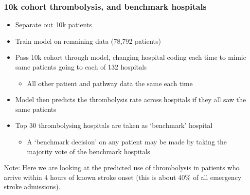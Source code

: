 \documentclass[xcolor={usenames,dvipsnames}]{beamer}
\begin{document}
\begin{frame}
\frametitle{10k cohort thrombolysis, and benchmark hospitals}

\begin{itemize}
  \item Separate out 10k patients 
  \item Train model on remaining data (78,792 patients)
  \item Pass 10k cohort through model, changing hospital coding each time to mimic same patients going to each of 132 hospitals
  \begin{itemize} 
    \item All other patient and pathway data the same each time
  \end{itemize} 
  \item Model then predicts the thrombolysis rate across hospitals if they all saw the same patients
  \item Top 30 thrombolysing hospitals are taken as ‘benchmark’
hospital
  \begin{itemize} 
    \item A ‘benchmark decision’ on any patient may be made by taking the majority vote of the benchmark hospitals
  \end{itemize} 
\end{itemize}


{\tiny
Note: Here we are looking at the predicted use of thrombolysis in patients who arrive within 4 hours of
known stroke onset (this is about 40\% of all emergency stroke admissions).}


\end{frame}


\end{document}
